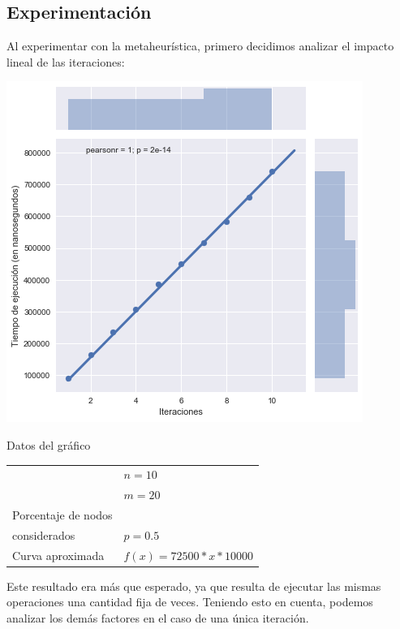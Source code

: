 \subsection{Experimentación}

Al experimentar con la metaheurística, primero decidimos analizar el impacto lineal de las iteraciones:

\noindent
\begin{minipage}{0.55\textwidth}
    \hfill
    \includegraphics[scale=0.6]{img/grasp-it.png}
\end{minipage}
\hfill
\begin{minipage}{0.44\textwidth}
    \begin{center}
        Datos del gráfico

        \begin{tabular}{ | l l |}
            \hline
             & $n = 10$ \\ 
             & $m = 20$ \\ 
            Porcentaje de nodos & \\
            considerados & $p = 0.5$ \\ 
            Curva aproximada & $f(x) = 72500 * x * 10000$ \\
            \hline
        \end{tabular}
    \end{center}
\end{minipage}

Este resultado era más que esperado, ya que resulta de ejecutar las mismas operaciones una cantidad fija de veces. Teniendo esto en cuenta, podemos analizar los demás factores en el caso de una única iteración.

